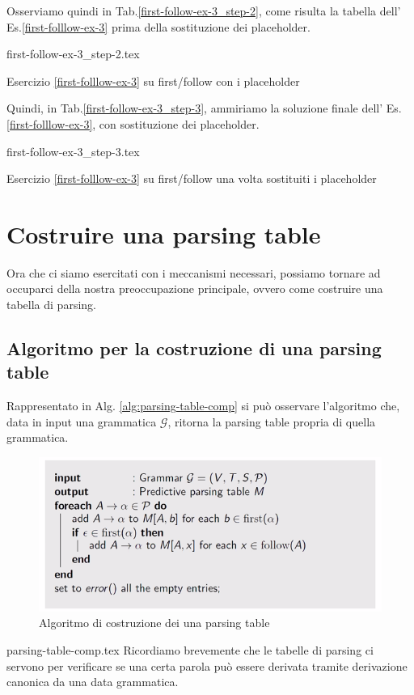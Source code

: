 \documentclass[class=book, crop=false, oneside, 12pt]{standalone}
\begin{document}
Osserviamo quindi in Tab.\ref{first-follow-ex-3_step-2}, come risulta la tabella dell' Es.\ref{first-folllow-ex-3} prima della sostituzione dei placeholder.
\begin{table}[H]
	\centering
	{first-follow-ex-3_step-2.tex}
    \caption{Esercizio \ref{first-folllow-ex-3} su first/follow con i placeholder}
    \label{first-follow-ex-3_step-2}
\end{table}
Quindi, in Tab.\ref{first-follow-ex-3_step-3}, ammiriamo la soluzione finale dell' Es.\ref{first-folllow-ex-3}, con sostituzione dei placeholder.
\begin{table}[H]
	\centering
	{first-follow-ex-3_step-3.tex}
    \caption{Esercizio \ref{first-folllow-ex-3} su first/follow una volta sostituiti i placeholder}
    \label{first-follow-ex-3_step-3}
\end{table}

\section{Costruire una parsing table}
Ora che ci siamo esercitati con i meccanismi necessari, possiamo tornare ad occuparci della nostra preoccupazione principale, ovvero come costruire una tabella di parsing.

\subsection{Algoritmo per la costruzione di una parsing table}
Rappresentato in Alg. \ref{alg:parsing-table-comp} si può osservare l'algoritmo che, data in input una grammatica \(\mathcal{G}\), ritorna la parsing table propria di quella grammatica. 

\begin{figure}[H]
    \centering
    \includegraphics[width=.8\textwidth]{algoritmo_parsing-table.png}
    \caption{Algoritmo di costruzione dei una parsing table}
    \label{algoritmo_parsing-table}
\end{figure}
{parsing-table-comp.tex}
Ricordiamo brevemente che le tabelle di parsing ci servono per verificare se una certa parola può essere derivata tramite derivazione canonica da una data grammatica.
\end{document}
